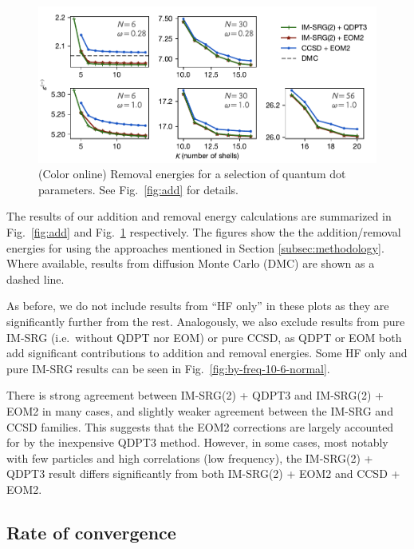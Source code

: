 \documentclass[aip, jcp, 12pt]{revtex4-1}
\begin{document}
\begin{figure}
  \centering
  \includegraphics{fig-rm2.pdf}
  \caption{(Color online) Removal energies for a selection of quantum dot parameters.  See Fig.\ \ref{fig:add} for details.}
  \label{fig:rm}
\end{figure}

The results of our addition and removal energy calculations are summarized in Fig.\ \ref{fig:add} and Fig.\ \ref{fig:rm} respectively.  The figures show the the addition/removal energies for using the approaches mentioned in Section \ref{subsec:methodology}.  Where available, results from diffusion Monte Carlo (DMC) \cite{PhysRevB.84.115302} are shown as a dashed line.

As before, we do not include results from ``HF only'' in these plots as they are significantly further from the rest.  Analogously, we also exclude results from pure IM-SRG (i.e.\ without QDPT nor EOM) or pure CCSD, as QDPT or EOM both add significant contributions to addition and removal energies.  Some HF only and pure IM-SRG results can be seen in Fig.\ \ref{fig:by-freq-10-6-normal}.

There is strong agreement between IM-SRG(2) + QDPT3 and IM-SRG(2) + EOM2 in many cases, and slightly weaker agreement between the IM-SRG and CCSD families.  This suggests that the EOM2 corrections are largely accounted for by the inexpensive QDPT3 method.  However, in some cases, most notably with few particles and high correlations (low frequency), the IM-SRG(2) + QDPT3 result differs significantly from both IM-SRG(2) + EOM2 and CCSD + EOM2.

\subsection{Rate of convergence}
\end{document}
